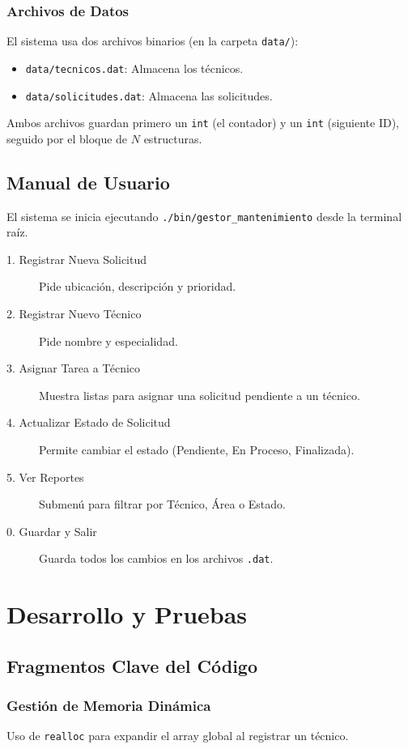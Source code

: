 \documentclass[12pt, letterpaper]{article}
\begin{document}
\subsubsection{Archivos de Datos}
El sistema usa dos archivos binarios (en la carpeta \texttt{data/}):
\begin{itemize}
    \item \texttt{data/tecnicos.dat}: Almacena los técnicos.
    \item \texttt{data/solicitudes.dat}: Almacena las solicitudes.
\end{itemize}
Ambos archivos guardan primero un \texttt{int} (el contador) y un \texttt{int} (siguiente ID), seguido por el bloque de $N$ estructuras.

\subsection{Manual de Usuario}
El sistema se inicia ejecutando \texttt{./bin/gestor\_mantenimiento} desde la terminal raíz.
\begin{description}
    \item[1. Registrar Nueva Solicitud] Pide ubicación, descripción y prioridad.
    \item[2. Registrar Nuevo Técnico] Pide nombre y especialidad.
    \item[3. Asignar Tarea a Técnico] Muestra listas para asignar una solicitud pendiente a un técnico.
    \item[4. Actualizar Estado de Solicitud] Permite cambiar el estado (Pendiente, En Proceso, Finalizada).
    \item[5. Ver Reportes] Submenú para filtrar por Técnico, Área o Estado.
    \item[0. Guardar y Salir] Guarda todos los cambios en los archivos \texttt{.dat}.
\end{description}

\newpage
\section{Desarrollo y Pruebas}

\subsection{Fragmentos Clave del Código}

\subsubsection{Gestión de Memoria Dinámica}
Uso de \texttt{realloc} para expandir el array global al registrar un técnico.

\end{document}
